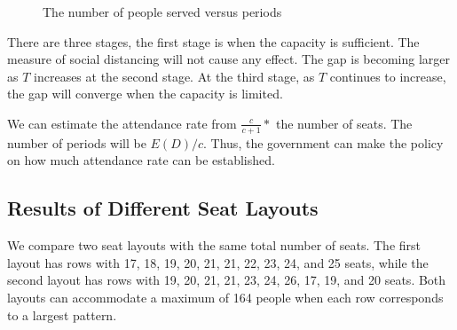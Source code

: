 \begin{figure}[h]
  \centering
  \caption{The number of people served versus periods}
  \label{Fig.lable}
\end{figure}


There are three stages, the first stage is when the capacity is sufficient. The measure of social distancing will not cause any effect. The gap is becoming larger as $T$ increases at the second stage. At the third stage, as $T$ continues to increase, the gap will converge when the capacity is limited.

We can estimate the attendance rate from $\frac{c}{c+1}*$ the number of seats. The number of periods will be $E(D)/c$. Thus, the government can make the policy on how much attendance rate can be established.

\subsection{Results of Different Seat Layouts}
We compare two seat layouts with the same total number of seats. The first layout has rows with 17, 18, 19, 20, 21, 21, 22, 23, 24, and 25 seats, while the second layout has rows with 19, 20, 21, 21, 23, 24, 26, 17, 19, and 20 seats. Both layouts can accommodate a maximum of 164 people when each row corresponds to a largest pattern.

